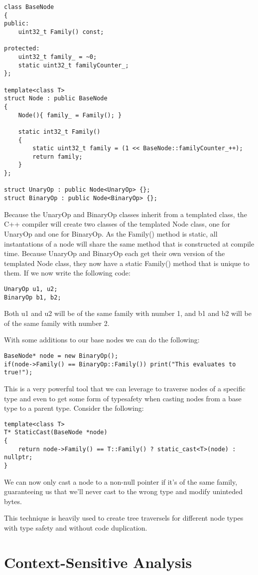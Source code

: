 \documentclass[12pt]{article}
\begin{document}
\begin{lstlisting}
class BaseNode
{
public:
	uint32_t Family() const;

protected:
	uint32_t family_ = ~0;
	static uint32_t familyCounter_;
};

template<class T>
struct Node : public BaseNode
{
	Node(){ family_ = Family(); }

	static int32_t Family()
	{
		static uint32_t family = (1 << BaseNode::familyCounter_++);
		return family;
	}
};

struct UnaryOp : public Node<UnaryOp> {};
struct BinaryOp : public Node<BinaryOp> {};
\end{lstlisting}
Because the UnaryOp and BinaryOp classes inherit from a templated class, the C++ compiler will create two classes of the templated Node class, one for UnaryOp and one for BinaryOp. As the Family() method is static, all instantations of a node will share the same method that is constructed at compile time. Because UnaryOp and BinaryOp each get their own version of the templated Node class, they now have a static Family() method that is unique to them. If we now write the following code:
\begin{lstlisting}
UnaryOp u1, u2;
BinaryOp b1, b2;
\end{lstlisting}
Both u1 and u2 will be of the same family with number 1, and b1 and b2 will be of the same family with number 2.

With some additions to our base nodes we can do the following:
\begin{lstlisting}
BaseNode* node = new BinaryOp();
if(node->Family() == BinaryOp::Family()) print("This evaluates to true!");
\end{lstlisting}
This is a very powerful tool that we can leverage to traverse nodes of a specific type and even to get some form of typesafety when casting nodes from a base type to a parent type. Consider the following:
\begin{lstlisting}
template<class T>
T* StaticCast(BaseNode *node)
{
	return node->Family() == T::Family() ? static_cast<T>(node) : nullptr;
}
\end{lstlisting}
We can now only cast a node to a non-null pointer if it's of the same family, guaranteeing us that we'll never cast to the wrong type and modify uninteded bytes.

This technique is heavily used to create tree traversels for different node types with type safety and without code duplication.

\section{Context-Sensitive Analysis}
\end{document}
